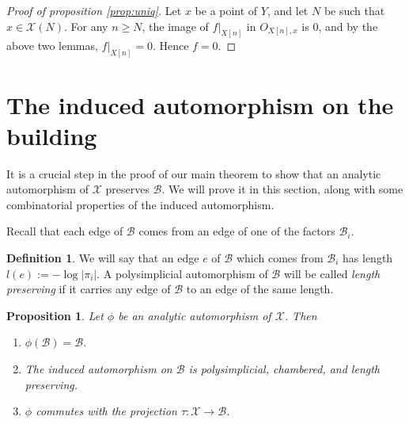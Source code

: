\documentclass{amsart}
\theoremstyle{theorem}
\theoremstyle{lemma}
\theoremstyle{prop}
\newtheorem{prop}[lemma]{Proposition}
\theoremstyle{definition}
\newtheorem{definition}[lemma]{Definition}
\theoremstyle{corollary}
\theoremstyle{remark}
\newcommand{\B}{\mathcal{B}}
\newcommand{\X}{\mathcal{X}}
\begin{document}
\begin{proof}[Proof of proposition \ref{prop:uniq}]
Let $x$ be a point of $Y$, and let $N$ be such that $x \in \X(N)$. For any $n \geq N$, the image of $f|_{X[n]}$ in $O_{X[n],x}$ is $0$, and by the above two lemmas, $f|_{X[n]}=0$. Hence $f=0$.
\end{proof}

\section{The induced automorphism on the building}

It is a crucial step in the proof of our main theorem to show that an analytic automorphism of $\X$ preserves $\B$.
We will prove it in this section, along with some combinatorial properties of the induced automorphism.

Recall that each edge of $\B$ comes from an edge of one of the factors $\B_i$.
\begin{definition}
We will say that an edge $e$ of $\B$ which comes from $\B_i$ has length $l(e):=-\log |\pi_i|$. A polysimplicial automorphism of $\B$ will be called \emph{length preserving} if it carries any edge of $\B$ to an edge of the same length.
\end{definition}

\begin{prop}\label{induce} Let $\phi$ be an analytic automorphism of $\X$. Then 
\begin{enumerate}
\item
$\phi(\B)=\B$.
\item The induced automorphism on $\B$ is polysimplicial, chambered, and length preserving.
\item $\phi$ commutes with the projection $\tau:\X \rightarrow \B$.
\end{enumerate}
\end{prop}
\end{document}
